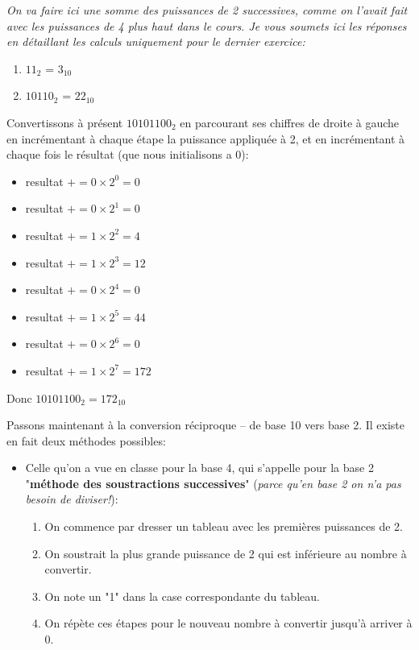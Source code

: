 \documentclass[12pt]{article}
\newenvironment{MaReponse}
		{\begin{greyedtextbox}\itshape} %
		{\end{greyedtextbox}}            %
\newenvironment{alphenum}
{\begin{enumerate}[label=\alph*.]}
	{\end{enumerate}}
\begin{document}
	\begin{MaReponse}
		On va faire ici une somme des puissances de 2 successives, comme on l'avait fait avec les puissances de 4 plus haut dans le cours. Je vous soumets ici les réponses en détaillant les calculs uniquement pour le dernier exercice:
		\begin{alphenum}
			\item $11_2$ = $3_{10}$
			\item $10110_2$ = $22_{10}$
		\end{alphenum}
		Convertissons à présent $10101100_2$ en parcourant ses chiffres de droite à gauche en incrémentant à chaque étape la puissance appliquée à 2, et en incrémentant à chaque fois le résultat (que nous initialisons a 0):
		\begin{itemize}
			\item resultat $+= 0\times2^0 = 0$
			\item resultat $+= 0\times2^1 = 0$
			\item resultat $+= 1\times2^2 = 4$
			\item resultat $+= 1\times2^3 = 12$
			\item resultat $+= 0\times2^4 = 0$
			\item resultat $+= 1\times2^5 = 44$
			\item resultat $+= 0\times2^6 = 0$
			\item resultat $+= 1\times2^7 = 172$\\
		\end{itemize}
		Donc $10101100_2 = 172_{10}$
	\end{MaReponse}
	
	Passons maintenant à la conversion réciproque -- de base 10 vers base 2. Il existe en fait deux méthodes possibles:
	\begin{itemize}
		\item Celle qu'on a vue en classe pour la base 4, qui s'appelle pour la base 2 "\textbf{méthode des soustractions successives}" (\textit{parce qu'en base 2 on n'a pas besoin de diviser!}):
		\begin{enumerate}
			\item On commence par dresser un tableau avec les premières puissances de 2.
			\item On soustrait la plus grande puissance de 2 qui est inférieure au nombre à convertir.
			\item On note un "1" dans la case correspondante du tableau.
			\item On répète ces étapes pour le nouveau nombre à convertir jusqu'à arriver à 0.
		\end{enumerate}
	\end{itemize}
	
\end{document}
